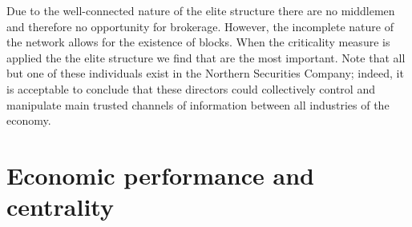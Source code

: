 \begin{table}[t]
\caption{Centrality statistics of 10 most central directors in the elite structure.}
\label{CentralElite}
\end{table}

Due to the well-connected nature of the elite structure there are no middlemen and therefore no opportunity for brokerage. However, the incomplete nature of the network allows for the existence of blocks. When the criticality measure is applied the the elite structure we find that are the most important. Note that all but one of these individuals exist in the Northern Securities Company; indeed, it is acceptable to conclude that these directors could collectively control and manipulate main trusted channels of information between all industries of the economy.

\section{Economic performance and centrality} \label{Application:Regression}

